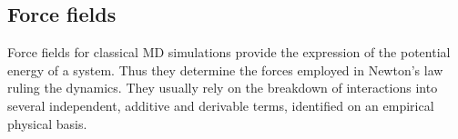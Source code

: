 

\subsection{Force fields}

Force fields for classical MD simulations provide the expression of the potential energy of a system. Thus they determine the forces employed in Newton's law ruling the dynamics.
%
They usually rely on the breakdown of interactions into several independent, additive and derivable terms, identified on an empirical physical basis.

